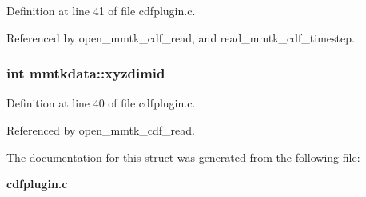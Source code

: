 Definition at line 41 of file cdfplugin.c.

Referenced by open\_\-mmtk\_\-cdf\_\-read, and read\_\-mmtk\_\-cdf\_\-timestep.
\subsubsection{\setlength{\rightskip}{0pt plus 5cm}int mmtkdata::xyzdimid}\label{structmmtkdata_m6}




Definition at line 40 of file cdfplugin.c.

Referenced by open\_\-mmtk\_\-cdf\_\-read.

The documentation for this struct was generated from the following file:\begin{CompactItemize}
\item 
{\bf cdfplugin.c}\end{CompactItemize}

